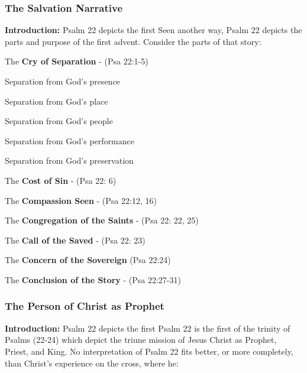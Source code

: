 \subsubsection{The Salvation Narrative}
\textbf{Introduction: }Psalm 22 depicts the first Seen another way, Psalm 22 depicts the parts and purpose of the first advent. Consider the parts of that story:
\begin{compactenum}[I.][8]
    \item The \textbf{Cry of Separation} - (Psa 22:1-5)
    \begin{compactenum}[A.]
        \item Separation from God's presence
        \item Separation from God's place
        \item Separation from God's people
        \item Separation from God's performance
        \item Separation from God's preservation
    \end{compactenum}
    \item The \textbf{Cost of Sin} - (Psa 22: 6)  
    \item The \textbf{Compassion Seen} - (Psa 22:12, 16)
    \item The \textbf{Congregation of the Saints} - (Psa 22: 22, 25)
    \item The \textbf{Call of the Saved} - (Psa 22: 23)
    \item The \textbf{Concern of the Sovereign}  (Psa 22:24)
    \item The \textbf{Conclusion of the Story}  - (Psa 22:27-31)
\end{compactenum}

\subsubsection{The Person of Christ as Prophet}
\textbf{Introduction: }Psalm 22 depicts the first Psalm 22 is the first of the trinity of Psalms (22-24) which depict the triune mission of Jesus Christ as Prophet, Priest, and King. No interpretation of Psalm 22 fits better, or more completely, than Christ's experience on the cross, where he:

